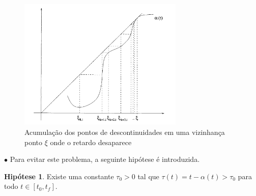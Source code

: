 \documentclass{beamer}
\theoremstyle{plain}
\theoremstyle{definition}
\newtheorem{hip}{Hipótese}
\begin{document}
\begin{frame}%

    \small

    \begin{figure}
        \begin{center}
            \includegraphics[width=0.7\textwidth, height=0.5\textheight]{desaparecimento_do_retardo.png}
        \end{center}
    \vspace{-0.3cm}
    \caption{\small Acumulação dos pontos de descontinuidades em uma vizinhança ponto $\xi$ onde o retardo desaparece}\label{fig:Desaparecimento do Retardo}
    \end{figure}


    \vspace{-0.3cm}
    $\bullet$ Para evitar este problema, a seguinte hipótese é introduzida.

    \begin{hip}
        Existe uma constante $ \tau_0 > 0 $ tal que $ \tau(t) = t - \alpha(t) > \tau_0 $ para todo $ t \in [t_0, t_f] $.
        \label{H1:hipotese:hypothesis}
    \end{hip}




\end{frame}


%
%     
%
%         
%
\end{document}

